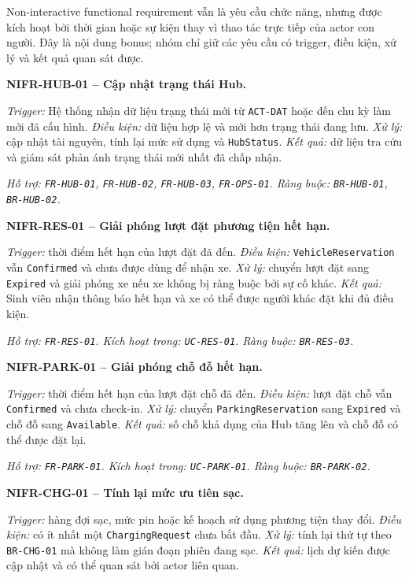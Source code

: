 Non-interactive functional requirement vẫn là yêu cầu chức năng, nhưng được kích hoạt bởi thời gian hoặc sự kiện thay vì thao tác trực tiếp của actor con người. Đây là nội dung bonus; nhóm chỉ giữ các yêu cầu có trigger, điều kiện, xử lý và kết quả quan sát được.

\noindent\textbf{NIFR-HUB-01 -- Cập nhật trạng thái Hub.}\par
\nopagebreak[4]
\textit{Trigger:} Hệ thống nhận dữ liệu trạng thái mới từ \texttt{ACT-DAT} hoặc đến chu kỳ làm mới đã cấu hình. \textit{Điều kiện:} dữ liệu hợp lệ và mới hơn trạng thái đang lưu. \textit{Xử lý:} cập nhật tài nguyên, tính lại mức sử dụng và \texttt{HubStatus}. \textit{Kết quả:} dữ liệu tra cứu và giám sát phản ánh trạng thái mới nhất đã chấp nhận.

\textit{Hỗ trợ: \texttt{FR-HUB-01}, \texttt{FR-HUB-02}, \texttt{FR-HUB-03}, \texttt{FR-OPS-01}. Ràng buộc: \texttt{BR-HUB-01}, \texttt{BR-HUB-02}.}

\medskip
\noindent\textbf{NIFR-RES-01 -- Giải phóng lượt đặt phương tiện hết hạn.}\par
\nopagebreak[4]
\textit{Trigger:} thời điểm hết hạn của lượt đặt đã đến. \textit{Điều kiện:} \texttt{VehicleReservation} vẫn \texttt{Confirmed} và chưa được dùng để nhận xe. \textit{Xử lý:} chuyển lượt đặt sang \texttt{Expired} và giải phóng xe nếu xe không bị ràng buộc bởi sự cố khác. \textit{Kết quả:} Sinh viên nhận thông báo hết hạn và xe có thể được người khác đặt khi đủ điều kiện.

\textit{Hỗ trợ: \texttt{FR-RES-01}. Kích hoạt trong: \texttt{UC-RES-01}. Ràng buộc: \texttt{BR-RES-03}.}

\medskip
\noindent\textbf{NIFR-PARK-01 -- Giải phóng chỗ đỗ hết hạn.}\par
\nopagebreak[4]
\textit{Trigger:} thời điểm hết hạn của lượt đặt chỗ đã đến. \textit{Điều kiện:} lượt đặt chỗ vẫn \texttt{Confirmed} và chưa check-in. \textit{Xử lý:} chuyển \texttt{ParkingReservation} sang \texttt{Expired} và chỗ đỗ sang \texttt{Available}. \textit{Kết quả:} số chỗ khả dụng của Hub tăng lên và chỗ đỗ có thể được đặt lại.

\textit{Hỗ trợ: \texttt{FR-PARK-01}. Kích hoạt trong: \texttt{UC-PARK-01}. Ràng buộc: \texttt{BR-PARK-02}.}

\medskip
\noindent\textbf{NIFR-CHG-01 -- Tính lại mức ưu tiên sạc.}\par
\nopagebreak[4]
\textit{Trigger:} hàng đợi sạc, mức pin hoặc kế hoạch sử dụng phương tiện thay đổi. \textit{Điều kiện:} có ít nhất một \texttt{ChargingRequest} chưa bắt đầu. \textit{Xử lý:} tính lại thứ tự theo \texttt{BR-CHG-01} mà không làm gián đoạn phiên đang sạc. \textit{Kết quả:} lịch dự kiến được cập nhật và có thể quan sát bởi actor liên quan.

